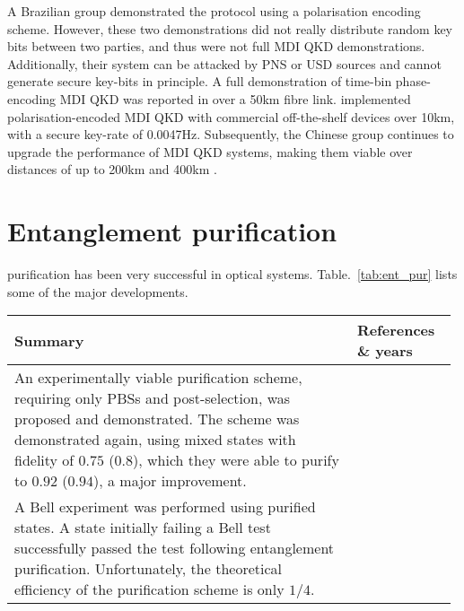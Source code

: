 A Brazilian group \cite{bib:PRA_88_052303} demonstrated the protocol using a polarisation encoding scheme. However, these two demonstrations did not really distribute random key bits between two parties, and thus were not full MDI QKD demonstrations. Additionally, their system can be attacked by PNS or USD  sources and cannot generate secure key-bits in principle. A full demonstration of time-bin phase-encoding MDI QKD was reported in \cite{bib:PRL_111_130502} over a 50km fibre link. \cite{bib:PRL_112_190503} implemented polarisation-encoded MDI QKD with commercial off-the-shelf devices over 10km, with a secure key-rate of 0.0047Hz. Subsequently, the Chinese group continues to upgrade the performance of MDI QKD systems, making them viable over distances of up to 200km \cite{bib:PRL_113_190501} and 400km \cite{bib:arx160606821}.

%
%

\section{Entanglement purification} 


 purification has been very successful in optical systems. Table.~\ref{tab:ent_pur} lists some of the major developments.

\begin{table*}[!htbp]
\caption{Developments in experimental entanglement purification.} \label{tab:ent_pur}
\begin{tabular}{|p{0.755\linewidth}|p{0.22\linewidth}|}
	\hline
	Summary & References \& years \\
	\hline \hline
	An experimentally viable purification scheme, requiring only PBSs and post-selection, was proposed and demonstrated. The scheme was demonstrated again, using mixed states with fidelity of $0.75$ ($0.8$), which they were able to purify to $0.92$ ($0.94$), a major improvement. & \cite{bib:Pan01, bib:Pan03} \\
	\hline
	A Bell experiment was performed using purified states. A state initially failing a Bell test successfully passed the test following entanglement purification. Unfortunately, the theoretical efficiency of the purification scheme is only $1/4$. & \cite{bib:PRL_94_040504, bib:Pan01} \\
	\hline
\end{tabular}
\end{table*}

